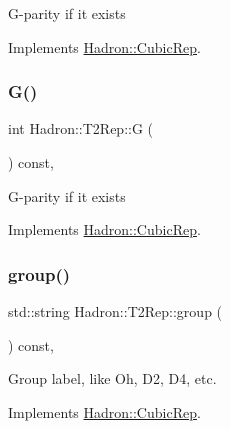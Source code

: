 G-\/parity if it exists 

Implements \mbox{\hyperlink{structHadron_1_1CubicRep_a52104e43266d1614c00bbd1c3b395458}{Hadron\+::\+Cubic\+Rep}}.

\mbox{\label{structHadron_1_1T2Rep_a909c7165132829f8e1b837f7afa00e61}} 
\subsubsection{\texorpdfstring{G()}{G()}\hspace{0.1cm}{\footnotesize\ttfamily [2/2]}}
{\footnotesize\ttfamily int Hadron\+::\+T2\+Rep\+::G (\begin{DoxyParamCaption}{ }\end{DoxyParamCaption}) const\hspace{0.3cm}{\ttfamily [inline]}, {\ttfamily [virtual]}}

G-\/parity if it exists 

Implements \mbox{\hyperlink{structHadron_1_1CubicRep_a52104e43266d1614c00bbd1c3b395458}{Hadron\+::\+Cubic\+Rep}}.

\mbox{\label{structHadron_1_1T2Rep_a88eec3e9213490d2f0df4e27ecb97072}} 
\subsubsection{\texorpdfstring{group()}{group()}\hspace{0.1cm}{\footnotesize\ttfamily [1/2]}}
{\footnotesize\ttfamily std\+::string Hadron\+::\+T2\+Rep\+::group (\begin{DoxyParamCaption}{ }\end{DoxyParamCaption}) const\hspace{0.3cm}{\ttfamily [inline]}, {\ttfamily [virtual]}}

Group label, like Oh, D2, D4, etc. 

Implements \mbox{\hyperlink{structHadron_1_1CubicRep_a0748f11ec87f387062c8e8981339a29c}{Hadron\+::\+Cubic\+Rep}}.

\mbox{\label{structHadron_1_1T2Rep_a88eec3e9213490d2f0df4e27ecb97072}} 
